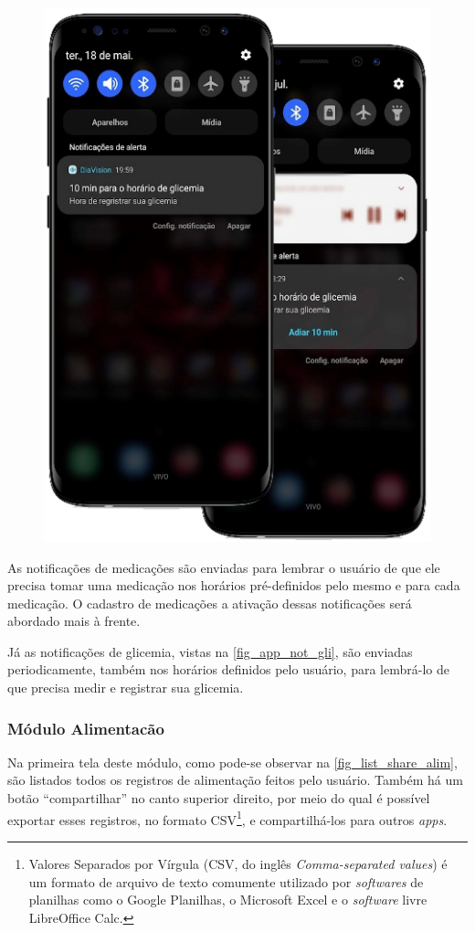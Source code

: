 \begin{figure}[htb]
\begin{minipage}{0.57\textwidth}
        \includegraphics[scale=0.57]{Imagens/desenvolvimento/app/app_not_gli.png}
    \end{minipage}
\end{figure}

As notificações de medicações são enviadas para lembrar o usuário de que ele precisa tomar uma medicação
nos horários pré-definidos pelo mesmo e para cada medicação. O cadastro de medicações a ativação dessas
notificações será abordado mais à frente.

Já as notificações de glicemia, vistas na \autoref{fig_app_not_gli}, são enviadas periodicamente, também
nos horários definidos pelo usuário, para lembrá-lo de que precisa medir e registrar sua glicemia.

\newpage

\subsubsection{Módulo Alimentacão}

Na primeira tela deste módulo, como pode-se observar na \autoref{fig_list_share_alim}, são listados todos
os registros de alimentação feitos pelo usuário. Também há um botão “compartilhar” no canto superior direito,
por meio do qual é possível exportar esses registros, no formato CSV\footnote{Valores Separados por Vírgula
    (CSV, do inglês \emph{Comma-separated values}) é um formato de arquivo de texto comumente utilizado por
    \emph{softwares} de planilhas como o Google Planilhas, o Microsoft Excel e o \emph{software} livre
    LibreOffice Calc.}, e compartilhá-los para outros \emph{apps}.

